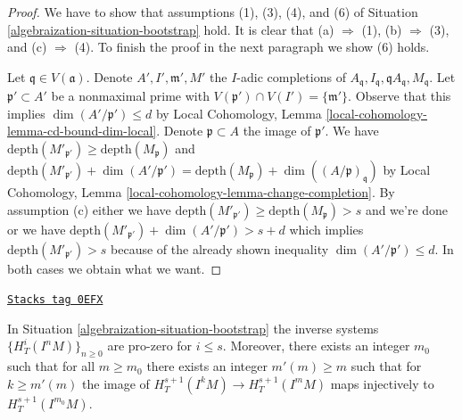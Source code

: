 \begin{proof}

We have to show that assumptions (1), (3), (4), and (6) of
Situation \ref{algebraization-situation-bootstrap} hold.
It is clear that (a) $\Rightarrow$ (1),
(b) $\Rightarrow$ (3), and (c) $\Rightarrow$ (4).
To finish the proof in the next paragraph we show (6) holds.

\medskip\noindent
Let $\mathfrak q \in V(\mathfrak a)$.
Denote $A', I', \mathfrak m', M'$
the $I$-adic completions of
$A_\mathfrak q, I_\mathfrak q, \mathfrak qA_\mathfrak q, M_\mathfrak q$.
Let $\mathfrak p' \subset A'$ be a nonmaximal prime with
$V(\mathfrak p') \cap V(I') = \{\mathfrak m'\}$.
Observe that this implies $\dim(A'/\mathfrak p') \leq d$
by Local Cohomology, Lemma \ref{local-cohomology-lemma-cd-bound-dim-local}.
Denote $\mathfrak p \subset A$ the image of $\mathfrak p'$.
We have
$\text{depth}(M'_{\mathfrak p'}) \geq \text{depth}(M_\mathfrak p)$ and
$\text{depth}(M'_{\mathfrak p'}) +
\dim(A'/\mathfrak p') =
\text{depth}(M_\mathfrak p) +
\dim((A/\mathfrak p)_\mathfrak q)$
by Local Cohomology, Lemma \ref{local-cohomology-lemma-change-completion}.
By assumption (c) either we have
$\text{depth}(M'_{\mathfrak p'}) \geq \text{depth}(M_\mathfrak p) > s$
and we're done or we have
$\text{depth}(M'_{\mathfrak p'}) +
\dim(A'/\mathfrak p') > s + d$ which implies
$\text{depth}(M'_{\mathfrak p'}) > s$ because of the already shown
inequality $\dim(A'/\mathfrak p') \leq d$. In both cases we
obtain what we want.
\end{proof}

\begin{lemma}[Bootstrap]
\label{algebraization-lemma-bootstrap}
\href{https://stacks.math.columbia.edu/tag/0EFX}{\texttt{Stacks tag 0EFX}}

In Situation \ref{algebraization-situation-bootstrap} the inverse systems
$\{H^i_T(I^nM)\}_{n \geq 0}$ are pro-zero for $i \leq s$.
Moreover, there exists an integer $m_0$ such that for all
$m \geq m_0$ there exists an integer $m'(m) \geq m$ such that for
$k \geq m'(m)$ the image of
$H^{s + 1}_T(I^kM) \to H^{s + 1}_T(I^mM)$
maps injectively to $H^{s + 1}_T(I^{m_0}M)$.
\end{lemma}

